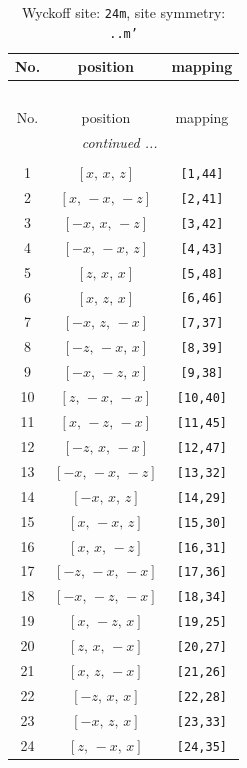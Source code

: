 \documentclass[fleqn,8pt]{jsarticle}
\begin{document}
\begin{longtable}{ccc}
\caption{Wyckoff site: {\tt 24m}, site symmetry: {\tt ..m'}}
 \\
 \hline \hline
No. & position & mapping \\ \hline \endfirsthead

\multicolumn{2}{l}{\tablename\ \thetable{}} \\
 \hline \hline
No. & position & mapping \\ \hline \endhead

 \hline \hline
\multicolumn{2}{r}{\footnotesize\it continued ...} \\ \endfoot

 \hline \hline
\multicolumn{2}{r}{} \\ \endlastfoot

1 & $\left[ x,\, x,\, z \right]$ & {\tt [1,44]} \\ \hline
2 & $\left[ x,\, - x,\, - z \right]$ & {\tt [2,41]} \\ \hline
3 & $\left[ - x,\, x,\, - z \right]$ & {\tt [3,42]} \\ \hline
4 & $\left[ - x,\, - x,\, z \right]$ & {\tt [4,43]} \\ \hline
5 & $\left[ z,\, x,\, x \right]$ & {\tt [5,48]} \\ \hline
6 & $\left[ x,\, z,\, x \right]$ & {\tt [6,46]} \\ \hline
7 & $\left[ - x,\, z,\, - x \right]$ & {\tt [7,37]} \\ \hline
8 & $\left[ - z,\, - x,\, x \right]$ & {\tt [8,39]} \\ \hline
9 & $\left[ - x,\, - z,\, x \right]$ & {\tt [9,38]} \\ \hline
10 & $\left[ z,\, - x,\, - x \right]$ & {\tt [10,40]} \\ \hline
11 & $\left[ x,\, - z,\, - x \right]$ & {\tt [11,45]} \\ \hline
12 & $\left[ - z,\, x,\, - x \right]$ & {\tt [12,47]} \\ \hline
13 & $\left[ - x,\, - x,\, - z \right]$ & {\tt [13,32]} \\ \hline
14 & $\left[ - x,\, x,\, z \right]$ & {\tt [14,29]} \\ \hline
15 & $\left[ x,\, - x,\, z \right]$ & {\tt [15,30]} \\ \hline
16 & $\left[ x,\, x,\, - z \right]$ & {\tt [16,31]} \\ \hline
17 & $\left[ - z,\, - x,\, - x \right]$ & {\tt [17,36]} \\ \hline
18 & $\left[ - x,\, - z,\, - x \right]$ & {\tt [18,34]} \\ \hline
19 & $\left[ x,\, - z,\, x \right]$ & {\tt [19,25]} \\ \hline
20 & $\left[ z,\, x,\, - x \right]$ & {\tt [20,27]} \\ \hline
21 & $\left[ x,\, z,\, - x \right]$ & {\tt [21,26]} \\ \hline
22 & $\left[ - z,\, x,\, x \right]$ & {\tt [22,28]} \\ \hline
23 & $\left[ - x,\, z,\, x \right]$ & {\tt [23,33]} \\ \hline
24 & $\left[ z,\, - x,\, x \right]$ & {\tt [24,35]} \\
\end{longtable}
\end{document}
